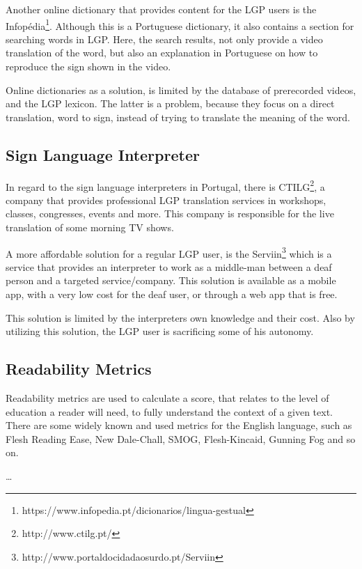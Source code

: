 Another online dictionary that provides content for the \gls{LGP} users is the Infopédia\footnote{https://www.infopedia.pt/dicionarios/lingua-gestual}.
Although this is a Portuguese dictionary, it also contains a section for searching words in \gls{LGP}.
Here, the search results, not only provide a video translation of the word, but also an explanation in Portuguese on how to reproduce the sign shown in the video.

Online dictionaries as a solution, is limited by the database of prerecorded videos, and the \gls{LGP} lexicon.
The latter is a problem, because they focus on a direct translation, word to sign, instead of trying to translate the meaning of the word.

\subsection{Sign Language Interpreter}

In regard to the sign language interpreters in Portugal, there is CTILG\footnote{http://www.ctilg.pt/}, a company that provides professional \gls{LGP} translation services in workshops, classes, congresses, events and more.
This company is responsible for the live translation of some morning TV shows.

A more affordable solution for a regular \gls{LGP} user, is the Serviin\footnote{http://www.portaldocidadaosurdo.pt/Serviin} which is a service that provides an interpreter to work as a middle-man between a deaf person and a targeted service/company.
This solution is available as a mobile app, with a very low cost for the deaf user, or through a  web app that is free.

This solution is limited by the interpreters own knowledge and their cost.
Also by utilizing this solution, the \gls{LGP} user is sacrificing some of his autonomy.

\subsection{Readability Metrics}

Readability metrics are used to calculate a score\cite{meyer2003text}, that relates to the level of education a reader will need, to fully understand the context of a given text.
There are some widely known and used metrics for the English language, such as Flesh Reading Ease, New Dale-Chall, SMOG, Flesh-Kincaid, Gunning Fog and so on.

\dots %

